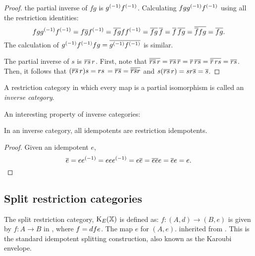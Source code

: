 \begin{proof}
          the partial inverse of $f g$ is ${g}^{(-1)} {f}^{(-1)}$. Calculating $f g {g}^{(-1)} {f}^{(-1)}$
          using all the restriction identities:
          \[
            f g {g}^{(-1)} {f}^{(-1)} = f \overline{g} {f}^{(-1)} = \overline{f g} f {f}^{(-1)} =
            \overline{f g}\, \overline{f} = \overline{f}\, \overline{f g} = \overline{\overline{f} f g} = \overline{f g}.
          \]
          The calculation of ${g}^{(-1)} {f}^{(-1)} f g = \overline{{g}^{(-1)} {f}^{(-1)}}$ is similar.
        \item The partial inverse of $s$ is $\overline{r s}\,r$. First, note
          that $\overline{\overline{r s}\,r}
          = \overline{r s}\,\overline{r}
          = \overline{r}\, \overline{r s}
          = \overline{\overline{r}\,r s}
          = \overline{r s}$.
          Then, it follows that $(\overline{r s}\,r) s
          = r s\,= \overline{r s}
          = \overline{\overline{r s}r} $ and
          $s (\restr{r s}\,r)
          = s r \restr{s} %
          = \restr{s}$.
      \eproofenum
    \end{proof}


    A restriction category in which every map is a partial
    isomorphism is called an \emph{inverse category}.

    An interesting property of inverse categories:

    \begin{lemma}
      \label{lem:inverse_idempotents_are_restriction_idempotents}
      In an inverse category, all idempotents are restriction idempotents.
    \end{lemma}
    \begin{proof}
      Given an idempotent $e$,
      \[
        \overline{e} = e{e}^{(-1)} = e e {e}^{(-1)} = e \overline{e} = \overline{e e} e = \overline{e} e = e.
      \]
    \end{proof}
  \subsection{Split restriction categories} %
    \label{sub:split_restriction_categories}

    The split restriction category, $\text{K}_{E}(\mathbb{X})$  is defined as: 
        {$f:(A,d)\to(B,e)$ is given by $f:A\to B$ in \X, where $f = d\hspace{0.1pt} f e$.}
        {The map $e$ for $(A,e)$.}
        {inherited from \X.}
    This is the standard idempotent splitting construction, also known as the Karoubi
    envelope.

